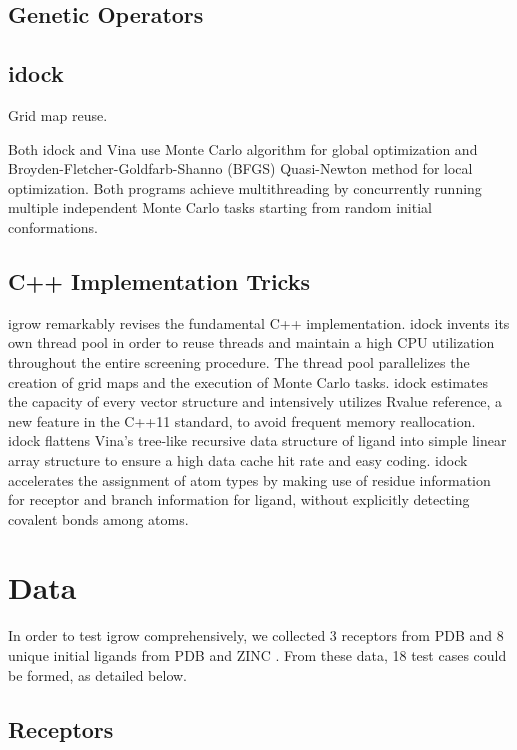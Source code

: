 \documentclass[10pt, conference, compsocconf]{IEEEtran}
\begin{document}
\subsection{Genetic Operators}



\subsection{idock}

Grid map reuse.

Both idock and Vina use Monte Carlo algorithm for global optimization and Broyden-Fletcher-Goldfarb-Shanno (BFGS) \cite{786} Quasi-Newton method for local optimization. Both programs achieve multithreading by concurrently running multiple independent Monte Carlo tasks starting from random initial conformations.

\subsection{C++ Implementation Tricks}

igrow remarkably revises the fundamental C++ implementation. idock invents its own thread pool in order to reuse threads and maintain a high CPU utilization throughout the entire screening procedure. The thread pool parallelizes the creation of grid maps and the execution of Monte Carlo tasks. idock estimates the capacity of every vector structure and intensively utilizes Rvalue reference, a new feature in the C++11 standard, to avoid frequent memory reallocation. idock flattens Vina's tree-like recursive data structure of ligand into simple linear array structure to ensure a high data cache hit rate and easy coding. idock accelerates the assignment of atom types by making use of residue information for receptor and branch information for ligand, without explicitly detecting covalent bonds among atoms.

\section{Data}

In order to test igrow comprehensively, we collected 3 receptors from PDB \cite{96} and 8 unique initial ligands from PDB and ZINC \cite{55}. From these data, 18 test cases could be formed, as detailed below.

\subsection{Receptors}
\end{document}

